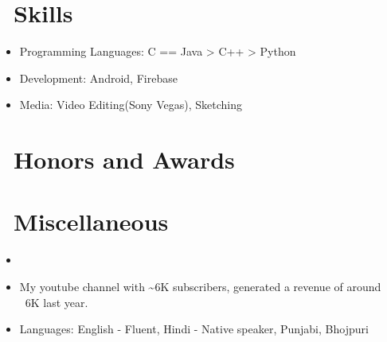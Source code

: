 \documentclass{resume}
\begin{document}
\section{\faCogs\ Skills}
\begin{itemize}[parsep=0.5ex]
  \item Programming Languages: C == Java > C++ > Python
  \item Development: Android, Firebase
  \item Media: Video Editing(Sony Vegas), Sketching 
\end{itemize}

\section{\faTrophy\ Honors and Awards}

\section{\faInfo\ Miscellaneous}
\begin{itemize}[parsep=0.5ex]
  \item {}
  \item {} My youtube channel with \sim6K subscribers, generated a revenue of around \rupee~6K last year.
  \item Languages: English - Fluent, Hindi - Native speaker, Punjabi, Bhojpuri
\end{itemize}

%
%
\end{document}
